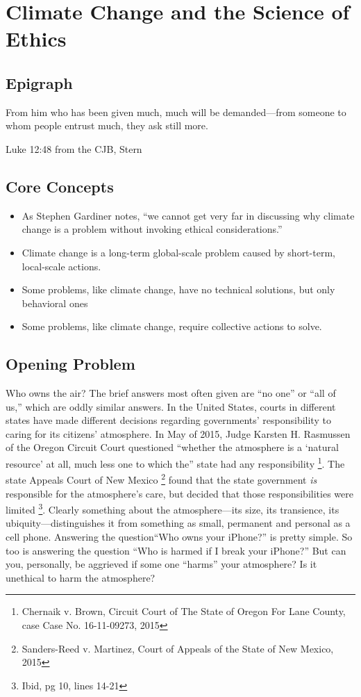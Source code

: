 \chapter{Climate Change and the Science of Ethics} \label{The Ethics of Climate Change}
\section{Epigraph}\label{Ethics_Epigraph}
\epigraph{From him who has been given much, much will be demanded---from someone to whom people entrust much, they ask still more.}{Luke 12:48 from the CJB, Stern} 

\section{Core Concepts} \label{Ethics_Core Concepts}
\begin{itemize}
	\item	As Stephen Gardiner notes, ``we cannot get very far in discussing why climate change is a problem without invoking ethical considerations.''
	\item	Climate change is a long-term global-scale problem caused by short-term, local-scale actions. 
	\item	Some problems, like climate change, have no technical solutions, but only behavioral ones
	\item	Some problems, like climate change, require collective actions to solve. 
\end{itemize}

\section{Opening Problem} \label{Who owns the air}
Who owns the air? The brief answers most often given are ``no one'' or ``all of us,'' which are oddly similar answers. In the United States, courts in different states have made different decisions regarding  governments' responsibility to caring for its citizens' atmosphere. In May of 2015, Judge Karsten H. Rasmussen of the Oregon Circuit Court questioned
``whether the atmosphere is a `natural resource' at all, much less one to which the'' state had any responsibility \footnote{Chernaik v. Brown, Circuit Court of The State of Oregon For Lane County, case Case No. 16-11-09273, 2015}. The state Appeals Court of New Mexico \footnote{Sanders-Reed v. Martinez, Court of Appeals of the State of New Mexico, 2015} found that the state government \emph{is} responsible for the atmosphere's care, but decided that those responsibilities were limited \footnote{Ibid, pg 10, lines 14-21}. Clearly something about the atmosphere---its size, its transience, its ubiquity---distinguishes it from something as small, permanent and personal as a cell phone. Answering the question``Who owns your iPhone?'' is pretty simple. So too is answering the question ``Who is harmed if I break your iPhone?'' But can you, personally, be aggrieved if some one ``harms'' your atmosphere? Is it unethical to harm the atmosphere?
 
